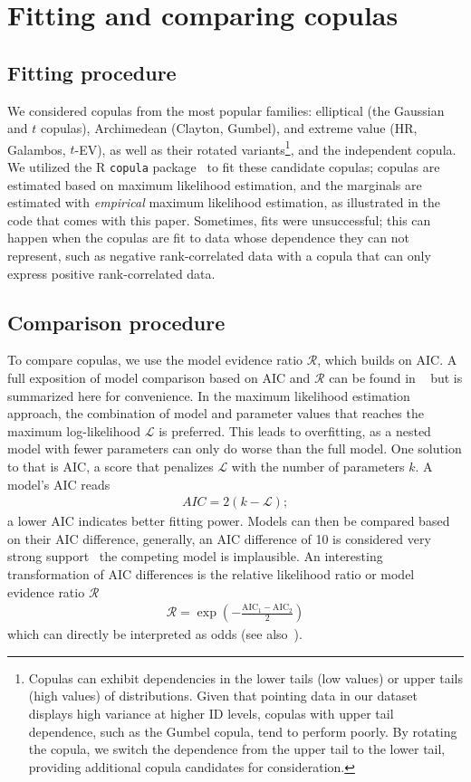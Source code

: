 \documentclass[acmlarge, manuscript,review]{acmart}
\begin{document}
\section{Fitting and comparing copulas\label{app:copula_method}}
\subsection{Fitting procedure\label{app:copula:fit}}
We considered copulas from the most popular families: elliptical (\eg the Gaussian and $t$ copulas), Archimedean (\eg Clayton, Gumbel), and extreme value (\eg HR, Galambos, $t$-EV), as well as their rotated variants\footnote{Copulas can exhibit dependencies in the lower tails (low values) or upper tails (high values) of distributions. Given that pointing data in our dataset displays high variance at higher ID levels, copulas with upper tail dependence, such as the Gumbel copula, tend to perform poorly. By rotating the copula, we switch the dependence from the upper tail to the lower tail, providing additional copula candidates for consideration.}, and the independent copula.
We utilized the R \texttt{copula} package~\cite{yan2007} to fit these candidate copulas; copulas are estimated based on maximum likelihood estimation, and the marginals are estimated with \textit{empirical} maximum likelihood estimation, as illustrated in the code that comes with this paper. 
Sometimes, fits were unsuccessful; this can happen when the copulas are fit to data whose dependence they can not represent, such as negative rank-correlated data with a copula that can only express positive rank-correlated data.

\subsection{Comparison procedure\label{app:copula:compare}}
To compare copulas, we use the model evidence ratio $\mathcal{R}$, which builds on AIC. A full exposition of model comparison based on AIC and $\mathcal{R}$ can be found in ~\cite{anderson2004} but is summarized here for convenience. In the maximum likelihood estimation approach, the combination of model and parameter values that reaches the maximum log-likelihood $\mathcal{L}$ is preferred. This leads to overfitting, as a nested model with fewer parameters can only do worse than the full model. One solution to that is AIC, a score that penalizes $\mathcal{L}$ with the number of parameters $k$. A model's AIC reads 
\begin{align}
	AIC = 2(k - \mathcal{L});
\end{align}
a lower AIC indicates better fitting power. Models can then be compared based on their AIC difference, generally, an AIC difference of 10 is considered very strong support~\cite{anderson2004} \ie the competing model is implausible. An interesting transformation of AIC differences is the relative likelihood ratio or model evidence ratio $\mathcal{R}$
\begin{align}
	\mathcal{R} = \exp \left(- \frac{\text{AIC}_1 - \text{AIC}_2}{2} \right)
\end{align}
which can directly be interpreted as odds (see also~\cite{wagenmakers2004}). 
\end{document}
